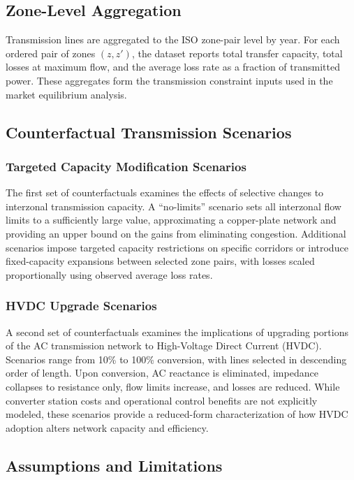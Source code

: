 \documentclass[12pt]{article}
\begin{document}
\subsection{Zone-Level Aggregation}

Transmission lines are aggregated to the ISO zone-pair level by year. For each ordered pair of zones $(z,z')$, the dataset reports total transfer capacity, total losses at maximum flow, and the average loss rate as a fraction of transmitted power. These aggregates form the transmission constraint inputs used in the market equilibrium analysis.

\subsection{Counterfactual Transmission Scenarios}

\subsubsection{Targeted Capacity Modification Scenarios}

The first set of counterfactuals examines the effects of selective changes to interzonal transmission capacity. A ``no-limits'' scenario sets all interzonal flow limits to a sufficiently large value, approximating a copper-plate network and providing an upper bound on the gains from eliminating congestion. Additional scenarios impose targeted capacity restrictions on specific corridors or introduce fixed-capacity expansions between selected zone pairs, with losses scaled proportionally using observed average loss rates.

\subsubsection{HVDC Upgrade Scenarios}

A second set of counterfactuals examines the implications of upgrading portions of the AC transmission network to High-Voltage Direct Current (HVDC). Scenarios range from 10\% to 100\% conversion, with lines selected in descending order of length. Upon conversion, AC reactance is eliminated, impedance collapses to resistance only, flow limits increase, and losses are reduced. While converter station costs and operational control benefits are not explicitly modeled, these scenarios provide a reduced-form characterization of how HVDC adoption alters network capacity and efficiency.

\subsection{Assumptions and Limitations}
\end{document}
